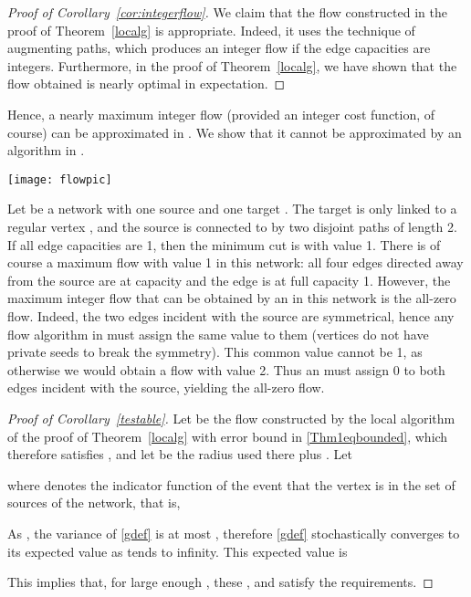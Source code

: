 \documentclass[12pt,a4paper]{article}
\renewcommand{\:}{\colon}
\begin{document}
\begin{proof}[Proof of Corollary~\ref{cor:integerflow}]
We claim that the flow  constructed in the proof of Theorem~\ref{localg} is appropriate. 
Indeed, it uses the technique of augmenting paths, which produces an integer flow if the edge capacities are integers.
Furthermore, in the proof of Theorem~\ref{localg}, we have shown that the flow obtained is nearly optimal in expectation. 
\end{proof}

Hence, a nearly maximum integer flow (provided an integer cost function, of course) can be approximated in . 
We show that it cannot be approximated by an algorithm in . 

\begin{center}
\texttt{[image: flowpic]}
\end{center}

Let  be a network with one source  and one target . 
The target is only linked to a regular vertex , and the source is connected to  by two disjoint paths of length 2. 
If all edge capacities are 1, then the minimum cut is  with value 1. 
There is of course a maximum flow with value 1 in this network: all four edges directed away from the source are at  capacity and the edge  is at full capacity 1. 
However, the maximum integer flow that can be obtained by an  in this network is the all-zero flow. 
Indeed, the two edges incident with the source are symmetrical, hence any flow algorithm in  must assign the same value to them (vertices do not have private seeds to break the symmetry). 
This common value cannot be 1, as otherwise we would obtain a flow with value 2. 
Thus an  must assign 0 to both edges incident with the source, yielding the all-zero flow. 

\begin{proof}[Proof of Corollary~\ref{testable}]
Let  be the flow constructed by the local algorithm of the proof of Theorem~\ref{localg} with error bound  in \eqref{Thm1eqbounded}, which therefore satisfies , and let  be the radius used there plus . 
Let 


where  denotes the indicator function of the event that the vertex  is in the set of sources  of the network, that is, 


As , the variance of \eqref{gdef} is at most , therefore \eqref{gdef} stochastically converges to its expected value as  tends to infinity. 
This expected value is

This implies that, for large enough , these ,  and  satisfy the requirements.
\end{proof}
\end{document}
